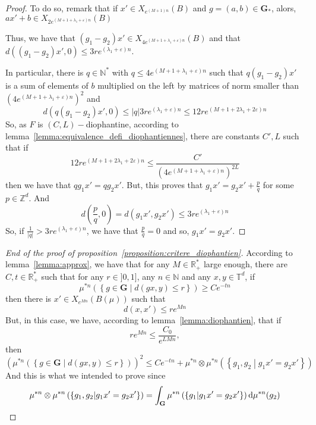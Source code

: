 \documentclass[11pt]{amsart}
\theoremstyle{definition}
\theoremstyle{remark}
\numberwithin{equation}{section}
\begin{document}
\begin{proof}
To do so, remark that if $x'\in X_{e^{(M+1)n}}(B)$ and $g=(a,b)\in {\mathbf G}_\ast$, alors, $a x'+b \in X_{2 e^{(M+1 +\lambda_1 + \varepsilon)n}}(B)$

Thus, we have that $(g_1 - g_2) x' \in X_{4e^{(M+1+\lambda_1 +\varepsilon)n}}(B)$ and that $d((g_1 - g_2)x',0) \leqslant 3re^{(\lambda_1 + \varepsilon)n}$.

In particular, there is $q\in {\mathbb N}^\ast$ with $q\leqslant 4e^{(M+1+\lambda_1 +\varepsilon)n}$ such that $q(g_1-g_2)x'$ is a sum of elements of $b$ multiplied on the left by matrices of norm smaller than $(4e^{(M+1+\lambda_1 +\varepsilon)n})^2$ and
\[
d(q(g_1-g_2)x',0) \leqslant |q|3r e^{(\lambda_1 + \varepsilon)n} \leqslant 12re^{(M+1+2\lambda_1 +2\varepsilon)n}
\]
So, as $F$ is $(C,L)-$diophantine, according to lemma~\ref{lemma:equivalence_defi_diophantiennes}, there are constants $C',L$ such that if
\[
12re^{(M+1+2\lambda_1 +2\varepsilon)n} \leqslant \frac{C'} {(4e^{(M+1+\lambda_1 +\varepsilon)n})^{2L}}
\]
then we have that $qg_1 x'=qg_2 x'$. But, this proves that $g_1 x' = g_2 x' + \frac pq$ for some $p\in {\mathbb Z}^d$. And
\[
d\left(\frac pq,0\right)=d(g_1x',g_2 x') \leqslant 3r e^{(\lambda_1 + \varepsilon)n}
\]
So, if $\frac 1 {|q| }> 3r e^{(\lambda_1 +\varepsilon)n}$, we have that $\frac pq=0$ and so, $g_1 x'=g_2 x'$.
\end{proof}

\begin{proof}[End of the proof of proposition~\ref{proposition:critere_diophantien}]
According to lemma~\ref{lemma:approx}, we have that for any $M\in {\mathbb R}_+^\ast$ large enough, there are $C,t\in {\mathbb R}_+^\ast$ such that for any $r\in ]0,1]$, any $n\in {\mathbb N}$ and any $x,y\in {\mathbb T}^d$, if
\[
\mu^{\ast n}\left(\left\{g\in {\mathbf G} \middle| d(gx,y)\leqslant r\right\}\right) \geqslant Ce^{-tn}
\]
then there is $x'\in X_{e^{Mn}}(B(\mu))$ such that
\[
d(x,x') \leqslant re^{Mn}
\]
But, in this case, we have, according to lemma~\ref{lemma:diophantien}, that if
\[
re^{Mn} \leqslant \frac{C_0}{e^{LMn}},
\]
then
\[
\left(\mu^{\ast n}\left(\left\{ g\in {\mathbf G}\middle| d(gx,y) \leqslant r\right\}\right) \right)^2\leqslant Ce^{-tn} + \mu^{\ast n}\otimes \mu^{\ast n}\left(\left\{g_1,g_2 \middle| g_1x'=g_2 x'\right\} \right)
\]
And this is what we intended to prove since
\[
\mu^{\ast n}\otimes \mu^{\ast n}\left(\left\{g_1,g_2 \middle| g_1x'=g_2 x'\right\} \right) = \int_{\mathbf G} \mu^{\ast n} \left( \left\{ g_1 \middle| g_1 x' = g_2 x' \right\}\right) {{\rm d}}\mu^{\ast n}(g_2)\qedhere
\]
\end{proof}
\end{document}
